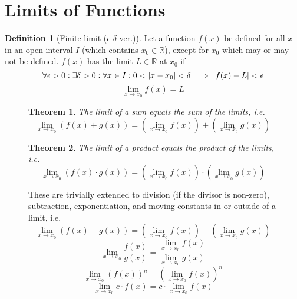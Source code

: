 \documentclass{article}
\theoremstyle{plain}
\newtheorem{theorem}{Theorem}[section]
\numberwithin{theorem}{section}
\theoremstyle{definition}
\newtheorem{definition}{Definition}[section]
\numberwithin{definition}{section}
\theoremstyle{remark}
\numberwithin{note}{section}
\newcommand*{\R}{\mathbb{R}}
\begin{document}
\section{Limits of Functions}
\begin{definition}[Finite limit ($\epsilon$-$\delta$ ver.)]
    Let a function $f(x)$ be defined for all $x$ in an open interval $I$
    (which contains $x_0 \in \R$), except for $x_0$ which may or may not be defined.
    $f(x)$ has the limit $L \in \R$ at $x_0$ if
    \[ \forall\epsilon>0: \exists\delta>0: \forall x \in I: 0<\abs{x-x_0}<\delta
    \implies \abs{f(x)-L}<\epsilon \]
    \[ \lim_{x\to x_0} f(x) = L \]
\end{definition}
%
\begin{figure}[H]
\begin{mdframed}[style=exampledefault,frametitle={Limit laws}]
    \begin{theorem} The limit of a sum equals the sum of the limits, i.e.
        \begin{equation*}
              \lim_{x\to x_0}\left(f(x)+g(x)\right)
            = \left(\lim_{x\to x_0}f(x)\right) + \left(\lim_{x\to x_0}g(x)\right)
        \end{equation*}
    \end{theorem}
    \begin{theorem} The limit of a product equals the product of the limits, i.e.
        \begin{equation*}
          \lim_{x\to x_0}\left(f(x)\cdot g(x)\right)
        = \left(\lim_{x\to x_0}f(x)\right) \cdot \left(\lim_{x\to x_0}g(x)\right)
        \end{equation*}
    \end{theorem}

        These are trivially extended to
        division (if the divisor is non-zero),
        subtraction, exponentiation, and moving constants in or outside of a limit, i.e.
        \begin{equation*}
          \lim_{x\to x_0}\left(f(x) - g(x)\right)
        = \left(\lim_{x\to x_0}f(x)\right) - \left(\lim_{x\to x_0}g(x)\right)
        \end{equation*}
        \begin{equation*}
        \lim_{x\to x_0}\frac{f(x)}{g(x)}
        = \frac{\lim_{x\to x_0}f(x)}{\lim_{x\to x_0}g(x)}
        \end{equation*}
        \begin{equation*}
        \lim_{x\to x_0}\left(f(x)\right)^n
        = \left(\lim_{x\to x_0}f(x)\right)^n
        \end{equation*}
        \begin{equation*}
        \lim_{x\to x_0} c \cdot f(x)
        = c \cdot \lim_{x\to x_0}f(x)
        \end{equation*}
\end{mdframed}
\end{figure}
\end{document}
